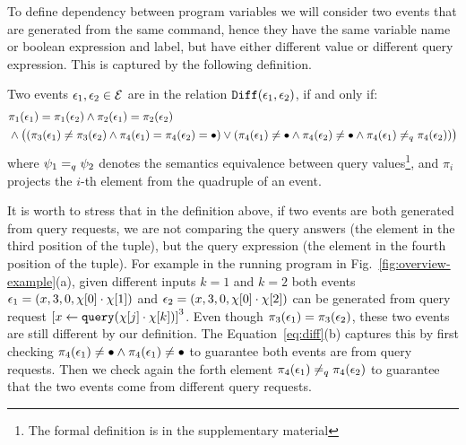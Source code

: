 To define dependency between program variables we will consider two events that are generated from the same command, hence they have the same variable name or boolean expression and label, but have either different value or different query expression. This is captured by the following definition. 

\begin{defn}
\label{def:diff}
Two events $\mathtt{\epsilon}_1, \mathtt{\epsilon}_2 \in \mathcal{E}$ are in the relation $\mathtt{Diff}(\mathtt{\epsilon}_1, \mathtt{\epsilon}_2)$, if and only if:
{\small
\begin{subequations}
\begin{align}
& \pi_1(\mathtt{\epsilon}_1) = \pi_1(\mathtt{\epsilon}_2) 
  \land  
  \pi_2(\mathtt{\epsilon}_1) = \pi_2(\mathtt{\epsilon}_2) \\
& \land  
  \big(
   (\pi_3(\mathtt{\epsilon}_1) \neq \pi_3(\mathtt{\epsilon}_2)
  \land 
  \pi_{4}(\mathtt{\epsilon}_1) = \pi_{4}(\mathtt{\epsilon}_2) = \bullet )
  \lor 
  (\pi_4(\mathtt{\epsilon}_1) \neq \bullet
  \land 
  \pi_4(\mathtt{\epsilon}_2) \neq \bullet
  \land 
  \pi_{4}(\mathtt{\epsilon}_1) \neq_q \pi_{4}(\mathtt{\epsilon}_2)) 
  \big)
\end{align}
\label{eq:diff}
\end{subequations}
}
where $\psi_1 =_{q} \psi_2$ denotes the semantics equivalence between query values\footnote{The formal definition is in the supplementary material},
and $\pi_i$ projects the $i$-th element from the quadruple of an event.
\end{defn}
It is worth to stress that in the definition above, if two events are both generated from query requests, we are not comparing the query answers (the element in the third position of the tuple), but the query expression (the element in the fourth position of the tuple).
For example in the running program in Fig.~\ref{fig:overview-example}(a), given different inputs $k = 1$ and $k = 2$
both events $\mathtt{\epsilon}_1 = (x, 3, 0, \chi[0] \cdot \chi[1])$ and $\mathtt{\epsilon}_2 = (x, 3, 0, \chi[0] \cdot \chi[2])$ can be generated from query request
$\clabel{\assign{x}{\query(\chi[j] \cdot \chi[k])} }^{3}$.
Even though $\pi_3(\mathtt{\epsilon}_1) = \pi_3(\mathtt{\epsilon}_2)$, these two events are still different by our definition.
The Equation~\ref{eq:diff}(b) captures this by first checking
$\pi_4(\mathtt{\epsilon}_1) \neq \bullet \land \pi_4(\mathtt{\epsilon}_1) \neq \bullet$ to guarantee
both events are from query requests.
Then we check again the forth element $\pi_4(\mathtt{\epsilon}_1) \neq_q \pi_4(\mathtt{\epsilon}_2)$ to guarantee
that the two events come from different query requests.

